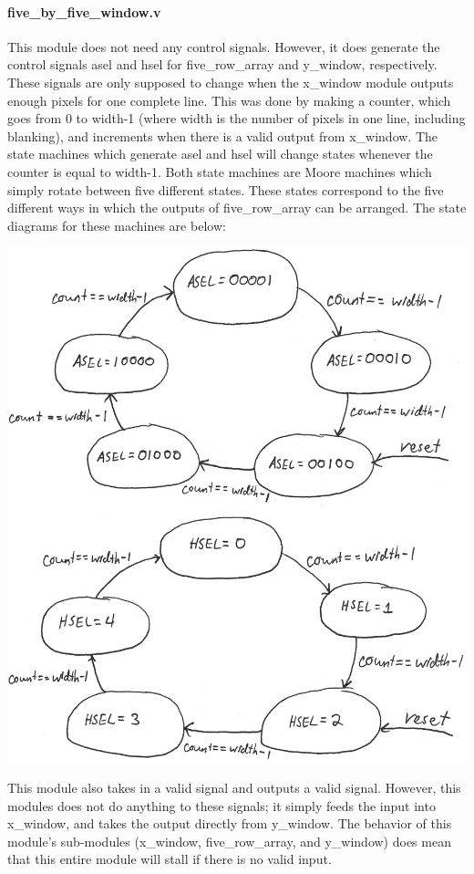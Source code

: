 \documentclass[12pt]{article}
\begin{document}
\paragraph{five\_by\_five\_window.v}
This module does not need any control signals. However, it does generate the 
control signals asel and hsel for five\_row\_array and y\_window, respectively. 
These signals are only supposed to change when the x\_window module outputs 
enough pixels for one complete line. This was done by making a counter, which 
goes from 0 to width-1 (where width is the number of pixels in one line, 
including blanking), and increments when there is a valid output from x\_window. 
The state machines which generate asel and hsel will change states whenever the 
counter is equal to width-1. Both state machines are Moore machines which simply 
rotate between five different states. These states correspond to the five 
different ways in which the outputs of five\_row\_array can be arranged. The state 
diagrams for these machines are below:


\includegraphics[width=\textwidth]{processed_image_pngs/sel_states.png}


This module also takes in a valid signal and outputs a valid signal. However, 
this modules does not do anything to these signals; it simply feeds the input 
into x\_window, and takes the output directly from y\_window. The behavior of this 
module's sub-modules (x\_window, five\_row\_array, and y\_window) does mean that 
this entire module will stall if there is no valid input.
\end{document}
